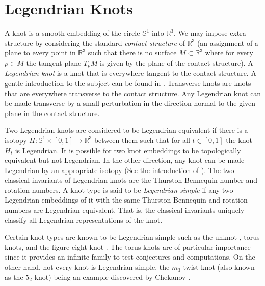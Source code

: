 \documentclass{article}
\theoremstyle{plain}
\begin{document}
	\section{Legendrian Knots}
	    A knot is a smooth embedding of the circle $\mathbb{S}^{1}$ into
	    $\mathbb{R}^{3}$. We may impose extra structure by considering the
	    standard \textit{contact structure} of $\mathbb{R}^{3}$ (an assignment
	    of a plane to every point in $\mathbb{R}^{3}$ such that there is no
	    surface $M\subset\mathbb{R}^{3}$ where for every $p\in{M}$ the tangent
	    plane $T_{p}M$ is given by the plane of the contact structure). A
	    \textit{Legendrian knot} is a knot that is everywhere tangent to the
	    contact structure. A gentle introduction to the subject can be found in
	    \cite{JoshuaMSabloffWhatIsLegendrianKnot}. Transverse knots are knots
	    that are everywhere transverse to the contact structure. Any Legendrian
	    knot can be made transverse by a small perturbation in the direction
	    normal to the given plane in the contact structure.
	    \par\hfill\par
	    Two Legendrian knots are considered to be Legendrian equivalent if
	    there is a isotopy
	    $H:\mathbb{S}^{1}\times[0,1]\rightarrow\mathbb{R}^{3}$ between them
	    such that for all $t\in[0,1]$ the knot $H_{t}$ is Legendrian. It is
	    possible for two knot embeddings to be topologically equivalent but not
	    Legendrian. In the other direction, any knot can be made Legendrian by
	    an appropriate isotopy (See the introduction of
	    \cite{VeraVertessiTransNonSimpleKnots}). The two classical invariants
	    of Legendrian knots are the Thurston-Bennequin number and rotation
	    numbers. A knot type is said to be \textit{Legendrian simple} if
	    any two Legendrian embeddings of it with the same Thurston-Bennequin
	    and rotation numbers are Legendrian equivalent. That is, the classical
	    invariants uniquely classify all Legendrian representations of the
	    knot.
	    \par\hfill\par
	    Certain knot types are known to be Legendrian simple such as the unknot
	    \cite{EliashbergFraserClassificationTopTrivialLegKnots}, torus knots,
	    and the figure eight knot \cite{EtnyreHondaContactTopologyI}. The torus
	    knots are of particular importance since it provides an infinite
	    family to test conjectures and computations. On the other hand,
	    not every knot is Legendrian simple, the $m_{3}$ twist knot (also
	    known as the $5_{2}$ knot) being an example discovered by Chekanov
	    \cite{ChekanovDifAlgOfLegLinks}.
\end{document}
